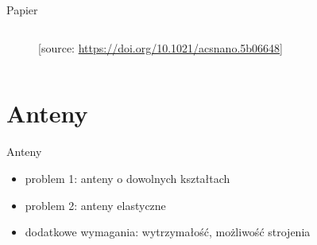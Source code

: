 \documentclass{beamer}
\begin{document}
\begin{frame}{Papier}
\begin{figure}
\begin{columns}
\begin{column}{0.4\textwidth}
{        [source: \url{https://doi.org/10.1021/acsnano.5b06648}]}
                \end{column}
        \end{columns}
    \end{figure}
\end{frame}

\section{Anteny}

\begin{frame}{Anteny}
    \begin{itemize}
        \item problem 1: anteny o dowolnych kształtach
        \item problem 2: anteny elastyczne
        \item dodatkowe wymagania: wytrzymałość, możliwość strojenia
    \end{itemize}
\end{frame}
\end{document}
